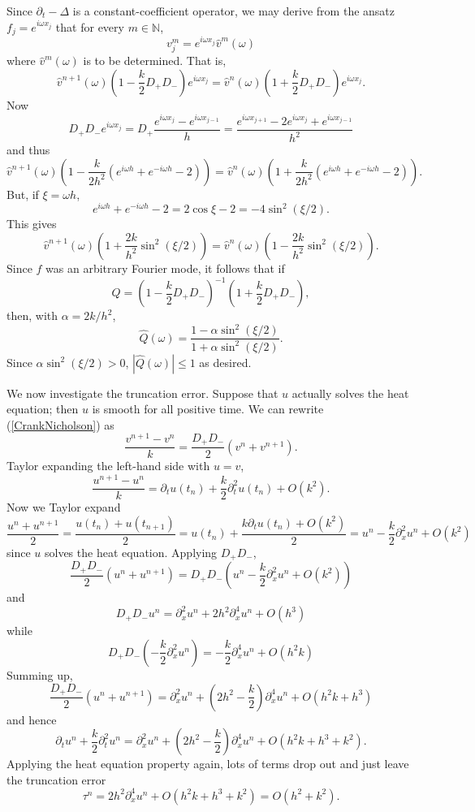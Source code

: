 \documentclass[10pt]{article}
\newcommand{\NN}{\mathbb{N}}
\theoremstyle{definition}
\begin{document}
Since $\partial_t - \Delta$ is a constant-coefficient operator, we may derive from the ansatz $f_j = e^{i\omega x_j}$ that for every $m \in \NN$,
$$v^m_j = e^{i\omega x_j} \hat v^m(\omega)$$
where $\hat v^m(\omega)$ is to be determined. That is,
$$\hat v^{n + 1}(\omega) (1 - \frac{k}{2} D_+ D_-) e^{i\omega x_j} = \hat v^n(\omega) (1 + \frac{k}{2} D_+ D_-) e^{i\omega x_j}.$$
Now
$$D_+D_- e^{i\omega x_j} = D_+ \frac{e^{i\omega x_j} - e^{i\omega x_{j - 1}}}{h} = \frac{e^{i\omega x_{j + 1}} - 2e^{i\omega x_j} + e^{i\omega x_{j - 1}}}{h^2}$$
and thus
$$\hat v^{n+1}(\omega)(1 - \frac{k}{2h^2}(e^{i\omega h} + e^{-i\omega h} - 2)) = \hat v^n(\omega)(1 + \frac{k}{2h^2}(e^{i\omega h} + e^{-i\omega h} - 2)).$$
But, if $\xi = \omega h$,
$$e^{i\omega h} + e^{-i\omega h} - 2 = 2 \cos \xi - 2 = -4 \sin^2(\xi/2).$$
This gives
$$\hat v^{n+1}(\omega)(1 + \frac{2k}{h^2} \sin^2(\xi/2)) = \hat v^n(\omega)(1 - \frac{2k}{h^2} \sin^2(\xi/2)).$$
Since $f$ was an arbitrary Fourier mode, it follows that if
$$Q = (1 - \frac{k}{2} D_+ D_-)^{-1} (1 + \frac{k}{2} D_+ D_-),$$
then, with $\alpha = 2k/h^2$,
$$\hat Q(\omega) = \frac{1 - \alpha \sin^2(\xi/2)}{1 + \alpha \sin^2(\xi/2)}.$$
Since $\alpha \sin^2(\xi/2) > 0$, $|\hat Q(\omega)| \leq 1$ as desired.

We now investigate the truncation error.
Suppose that $u$ actually solves the heat equation; then $u$ is smooth for all positive time.
We can rewrite (\ref{CrankNicholson}) as
$$\frac{v^{n + 1} - v^n}{k} = \frac{D_+ D_-}{2}(v^n + v^{n + 1}).$$
Taylor expanding the left-hand side with $u = v$,
$$\frac{u^{n + 1} - u^n}{k} = \partial_t u(t_n) + \frac{k}{2} \partial^2_t u(t_n) + O(k^2).$$
Now we Taylor expand
$$\frac{u^n + u^{n + 1}}{2} = \frac{u(t_n) + u(t_{n + 1})}{2} = u(t_n) + \frac{k\partial_t u(t_n) + O(k^2)}{2} = u^n - \frac{k}{2}\partial_x^2 u^n + O(k^2)$$
since $u$ solves the heat equation.
Applying $D_+ D_-$,
$$\frac{D_+ D_-}{2}(u^n + u^{n + 1}) = D_+ D_- (u^n - \frac{k}{2}\partial_x^2 u^n + O(k^2))$$
and
$$D_+ D_- u^n = \partial^2_x u^n + 2h^2 \partial^4_x u^n + O(h^3)$$
while
$$D_+ D_- (-\frac{k}{2} \partial_x^2 u^n) = -\frac{k}{2} \partial_x^4 u^n + O(h^2k)$$
Summing up,
$$\frac{D_+ D_-}{2}(u^n + u^{n + 1}) = \partial_x^2 u^n + (2h^2 - \frac{k}{2}) \partial_x^4 u^n + O(h^2k + h^3)$$
and hence
$$\partial_t u^n + \frac{k}{2} \partial_t^2 u^n = \partial_x^2 u^n + (2h^2 - \frac{k}{2}) \partial_x^4 u^n + O(h^2k + h^3 + k^2).$$
Applying the heat equation property again, lots of terms drop out and just leave the truncation error
$$\tau^n = 2h^2 \partial_x^4 u^n + O(h^2k + h^3 + k^2) = O(h^2 + k^2).$$
\end{document}
